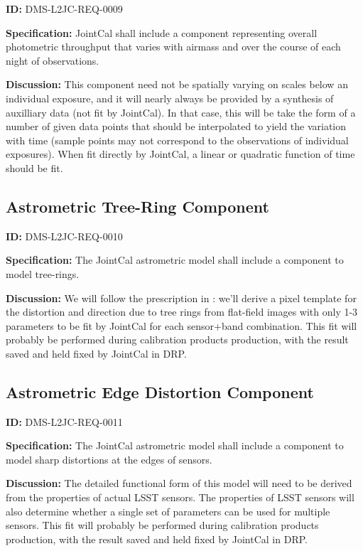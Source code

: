 \documentclass[SE,toc,lsstdraft]{lsstdoc}
\begin{document}
\label{DMS-L2JC-REQ-0009}
\textbf{ID:} DMS-L2JC-REQ-0009

\textbf{Specification:}
JointCal shall include a component representing overall photometric throughput that varies with airmass and over the course of each night of observations.

\textbf{Discussion:}
This component need not be spatially varying on scales below an individual exposure, and it will nearly always be provided by a synthesis of auxilliary data (not fit by JointCal).  In that case, this will be take the form of a number of given data points that should be interpolated to yield the variation with time (sample points may not correspond to the observations of individual exposures).  When fit directly by JointCal, a linear or quadratic function of time should be fit.

\subsection{Astrometric Tree-Ring Component}

\label{DMS-L2JC-REQ-0010}
\textbf{ID:} DMS-L2JC-REQ-0010

\textbf{Specification:}
The JointCal astrometric model shall include a component to model tree-rings.

\textbf{Discussion:}
We will follow the prescription in \citep{2017PASP..129g4503B}: we'll derive a pixel template for the distortion and direction due to tree rings from flat-field images with only 1-3 parameters to be fit by JointCal for each sensor+band combination.  This fit will probably be performed during calibration products production, with the result saved and held fixed by JointCal in DRP.

\subsection{Astrometric Edge Distortion Component}

\label{DMS-L2JC-REQ-0011}
\textbf{ID:} DMS-L2JC-REQ-0011

\textbf{Specification:}
The JointCal astrometric model shall include a component to model sharp distortions at the edges of sensors.

\textbf{Discussion:}
The detailed functional form of this model will need to be derived from the properties of actual LSST sensors.  The properties of LSST sensors will also determine whether a single set of parameters can be used for multiple sensors.  This fit will probably be performed during calibration products production, with the result saved and held fixed by JointCal in DRP.
\end{document}
